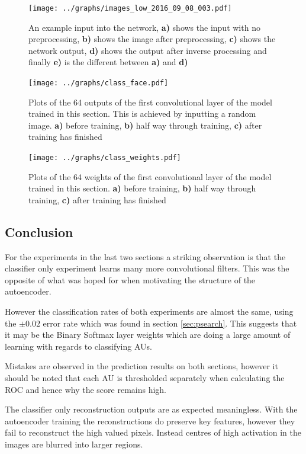         \begin{figure}[!h]
        \centering
        \texttt{[image: ../graphs/images\_low\_2016\_09\_08\_003.pdf]}
        \caption{An example input into the network, {\bf a)} shows the input with no preprocessing,
        {\bf b)} shows the image after preprocessing, {\bf c)} shows the network output, {\bf d)} shows the output after inverse processing
        and finally {\bf e)} is the different between {\bf a)} and {\bf d)}} \label{fig:recon4}
        \end{figure}

        \begin{figure}[!h]\label{fig:TODODOODOO6DO}
        \centering
        \texttt{[image: ../graphs/class\_face.pdf]}
        \caption{Plots of the 64 outputs of the first convolutional layer of the model trained in this section.
        This is achieved by inputting a random image.
        {\bf a)} before training,
        {\bf b)} half way through training,
        {\bf c)} after training has finished
        }
        \end{figure}

        \begin{figure}[!h]\label{fig:TODODO4ODOODO}
        \centering
        \texttt{[image: ../graphs/class\_weights.pdf]}
        \caption{Plots of the 64 weights of the first convolutional layer of the model trained in this section.
        {\bf a)} before training,
        {\bf b)} half way through training,
        {\bf c)} after training has finished
        }
        \end{figure}
      \clearpage
      \subsection{Conclusion}
        For the experiments in the last two sections a striking observation is that
        the classifier only experiment learns many more convolutional filters.
        This was the opposite of what was hoped for when motivating the structure
        of the autoencoder.

        However the classification rates of both experiments are almost the same,
        using the $\pm 0.02$ error rate which was found in section \ref{sec:psearch}.
        This suggests that it may be the Binary Softmax layer weights which are doing
        a large amount of learning with regards to classifying AUs.

        Mistakes are observed in the prediction results on both sections, however it should be noted
        that each AU is thresholded separately when calculating the ROC and hence why the
        score remains high.

        The classifier only reconstruction outputs are as expected meaningless.
        With the autoencoder training the reconstructions do preserve key features,
        however they fail to reconstruct the high valued pixels. Instead centres of high activation
        in the images are blurred into larger regions.
